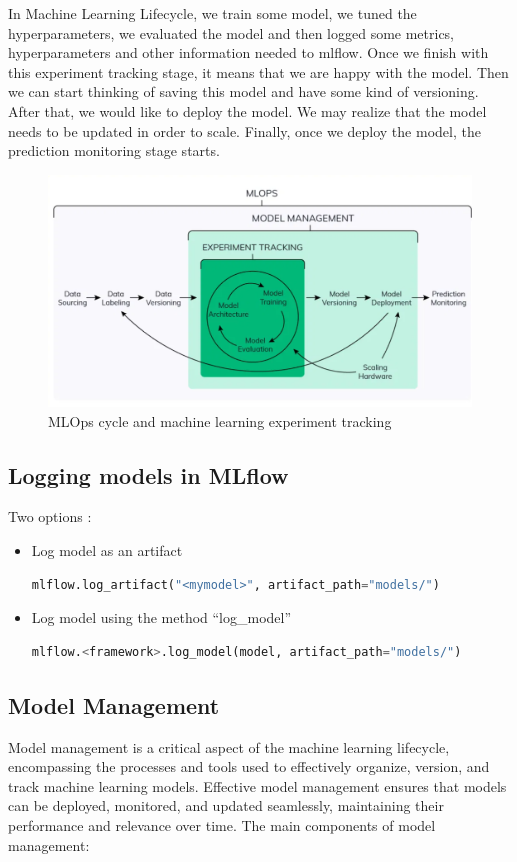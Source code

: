 \documentclass[letterpaper,12pt,notitlepage,twoside]{report}
\begin{document}
In Machine Learning Lifecycle,  we train some model, we tuned the hyperparameters, we evaluated the model and then logged some metrics, hyperparameters and other information needed to mlflow.  Once we finish with this experiment tracking stage, it means that we are happy with the model. Then we can start thinking of saving this model and have some kind of versioning. After that, we would like to deploy the model. We may realize that the model needs to be updated in order to scale. Finally, once we deploy the model, the prediction monitoring stage starts.

\begin{figure}[h]
	\centering
	\includegraphics[width=\textwidth]{Images/neptune-mlops.png}
	\caption{MLOps cycle and machine learning experiment tracking}
	\label{fig:4}
\end{figure}

\subsection{Logging models in MLflow}
Two options :
\begin{itemize}[noitemsep, topsep=0pt]
\item Log model as an artifact
\begin{lstlisting}[language=python, numbers=none]
mlflow.log_artifact("<mymodel>", artifact_path="models/")
\end{lstlisting}
\item Log model using the method ``log\_model''
\begin{lstlisting}[language=python, numbers=none]
mlflow.<framework>.log_model(model, artifact_path="models/")
\end{lstlisting}
\end{itemize}

\subsection{Model Management}
Model management is a critical aspect of the machine learning lifecycle, encompassing the processes and tools used to effectively organize, version, and track machine learning models. Effective model management ensures that models can be deployed, monitored, and updated seamlessly, maintaining their performance and relevance over time. The main components of model management:
\end{document}
